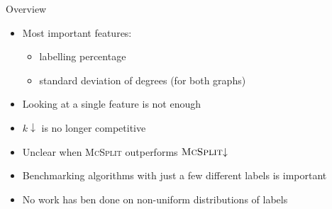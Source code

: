 \documentclass{beamer}
\begin{document}
\begin{frame}{Overview}
  \begin{itemize}
  \item Most important features:
    \begin{itemize}
    \item labelling percentage
    \item standard deviation of degrees (for both graphs)
    \end{itemize}
  \item Looking at a single feature is not enough
    \pause
  \item $k{\downarrow}$ is no longer competitive
  \item Unclear when \textsc{McSplit} outperforms $\textsc{McSplit}{\downarrow}$
    \pause
  \item Benchmarking algorithms with just a few different labels is important
  \item No work has ben done on non-uniform distributions of labels
  \end{itemize}
\end{frame}
\end{document}
